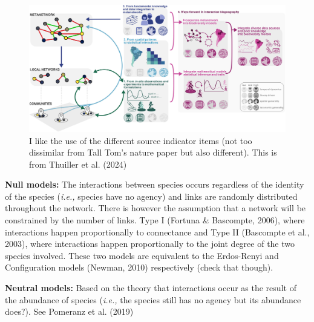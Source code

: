 \documentclass[
]{agujournal2019}
\begin{document}
\begin{figure}[H]

{\centering \includegraphics{images/thullier_2023_concept.jpeg}

}

\caption{I like the use of the different source indicator items (not too
dissimilar from Tall Tom's nature paper but also different). This is
from Thuiller et al. (2024)}

\end{figure}%

\textbf{Null models:} The interactions between species occurs regardless
of the identity of the species (\emph{i.e.,} species have no agency) and
links are randomly distributed throughout the network. There is however
the assumption that a network will be constrained by the number of
links. Type I (Fortuna \& Bascompte, 2006), where interactions happen
proportionally to connectance and Type II (Bascompte et al., 2003),
where interactions happen proportionally to the joint degree of the two
species involved. These two models are equivalent to the Erdos-Renyi and
Configuration models (Newman, 2010) respectively (check that though).

\textbf{Neutral models:} Based on the theory that interactions occur as
the result of the abundance of species (\emph{i.e.,} the species still
has no agency but its abundance does?). See Pomeranz et al. (2019)
\end{document}
